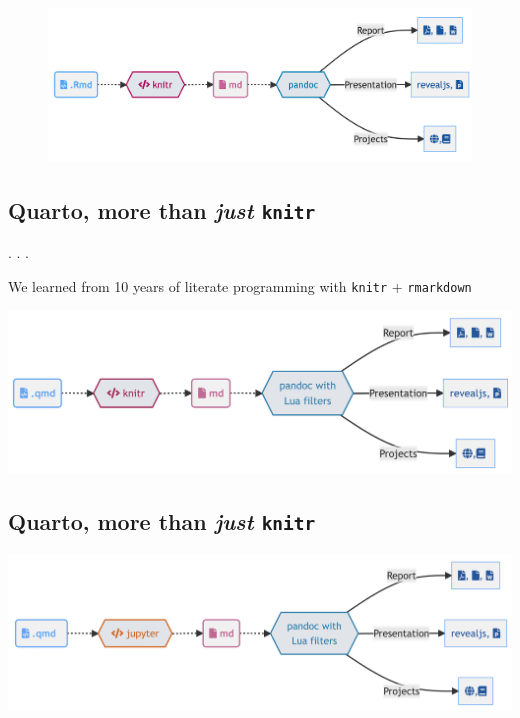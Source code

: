 \documentclass[
  letterpaper,
  DIV=11,
  numbers=noendperiod]{scrartcl}
\begin{document}
\begin{figure}

{\centering \includegraphics{images/rmd-knitr.png}

}

\end{figure}

\hypertarget{quarto-more-than-just-knitr}{%
\subsection{\texorpdfstring{Quarto, more than \emph{just}
\texttt{knitr}}{Quarto, more than just knitr}}\label{quarto-more-than-just-knitr}}

. . .

We learned from 10 years of literate programming with \texttt{knitr} +
\texttt{rmarkdown}

\includegraphics{images/qmd-knitr.jpeg}

\hypertarget{quarto-more-than-just-knitr-1}{%
\subsection{\texorpdfstring{Quarto, more than \emph{just}
\texttt{knitr}}{Quarto, more than just knitr}}\label{quarto-more-than-just-knitr-1}}

\includegraphics{images/qmd-jupyter.jpeg}
\end{document}

